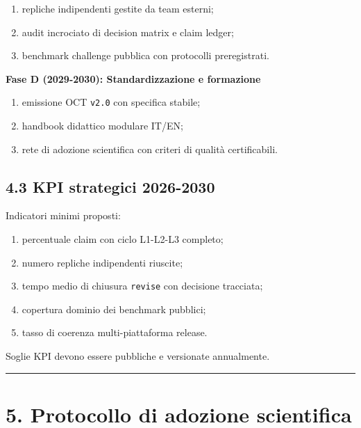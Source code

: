 \begin{enumerate}
\def\labelenumi{\arabic{enumi}.}
\tightlist
\item
  repliche indipendenti gestite da team esterni;
\item
  audit incrociato di decision matrix e claim ledger;
\item
  benchmark challenge pubblica con protocolli preregistrati.
\end{enumerate}

\textbf{Fase D (2029-2030): Standardizzazione e formazione}

\begin{enumerate}
\def\labelenumi{\arabic{enumi}.}
\tightlist
\item
  emissione OCT \texttt{v2.0} con specifica stabile;
\item
  handbook didattico modulare IT/EN;
\item
  rete di adozione scientifica con criteri di qualità certificabili.
\end{enumerate}

\subsection{4.3 KPI strategici 2026-2030}

Indicatori minimi proposti:

\begin{enumerate}
\def\labelenumi{\arabic{enumi}.}
\tightlist
\item
  percentuale claim con ciclo L1-L2-L3 completo;
\item
  numero repliche indipendenti riuscite;
\item
  tempo medio di chiusura \texttt{revise} con decisione tracciata;
\item
  copertura dominio dei benchmark pubblici;
\item
  tasso di coerenza multi-piattaforma release.
\end{enumerate}

Soglie KPI devono essere pubbliche e versionate annualmente.

\begin{center}\rule{0.5\linewidth}{0.5pt}\end{center}

\section{5. Protocollo di adozione scientifica}

